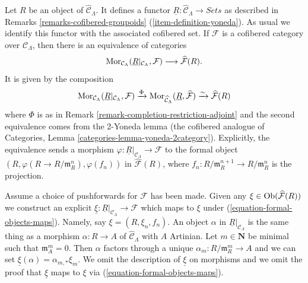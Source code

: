 \begin{remark}
\label{remark-formal-objects-yoneda}
Let $R$ be an object of $\widehat{\mathcal{C}}_\Lambda$.  It defines a functor
$\underline{R}: \widehat{\mathcal{C}}_\Lambda \to \textit{Sets}$
as described in
Remarks \ref{remarks-cofibered-groupoids} (\ref{item-definition-yoneda}).
As usual we identify this functor with the
associated cofibered set.  If $\mathcal{F}$ is a cofibered category over
$\mathcal{C}_\Lambda$, then there is an equivalence of categories
\begin{equation}
\label{equation-formal-objects-maps}
\mathop{\mathrm{Mor}}\nolimits_{\mathcal{C}_\Lambda}(
\underline{R}|_{\mathcal{C}_\Lambda}, \mathcal{F})
\longrightarrow
\widehat{\mathcal{F}}(R).
\end{equation}
It is given by the composition
$$
\mathop{\mathrm{Mor}}\nolimits_{\mathcal{C}_\Lambda}(
\underline{R}|_{\mathcal{C}_\Lambda}, \mathcal{F})
\xrightarrow{\Phi}
\mathop{\mathrm{Mor}}\nolimits_{\widehat{\mathcal{C}}_\Lambda}(
\underline{R}, \widehat{\mathcal{F}})
\xrightarrow{\sim}
\widehat{\mathcal{F}}(R)
$$
where $\Phi$ is as in
Remark \ref{remark-completion-restriction-adjoint}
and the second equivalence comes from the 2-Yoneda lemma
(the cofibered analogue of
Categories, Lemma \ref{categories-lemma-yoneda-2category}).
Explicitly, the equivalence sends a morphism
$\varphi : \underline{R}|_{\mathcal{C}_\Lambda} \to \mathcal{F}$
to the formal object
$(R, \varphi(R \to R/\mathfrak{m}_R^n), \varphi(f_n))$ in
$\widehat{\mathcal{F}}(R)$, where
$f_n : R/\mathfrak m_R^{n + 1} \to R/\mathfrak m_R^n$ is the projection.

\medskip\noindent
Assume a choice of pushforwards for $\mathcal{F}$ has been made.
Given any $\xi \in \mathop{\mathrm{Ob}}\nolimits(\widehat{\mathcal{F}}(R))$ we construct
an explicit
$\underline{\xi} : \underline{R}|_{\mathcal{C}_\Lambda} \to \mathcal{F}$
which maps to $\xi$ under (\ref{equation-formal-objects-maps}).
Namely, say $\xi = (R, \xi_n, f_n)$. An object $\alpha$ in
$\underline{R}|_{\mathcal{C}_\Lambda}$ is the same thing as a morphism
$\alpha : R \to A$ of $\widehat{\mathcal{C}}_\Lambda$ with $A$
Artinian. Let $m \in \mathbf{N}$ be minimal such that $\mathfrak m_A^m = 0$.
Then $\alpha$ factors through a unique $\alpha_m : R/\mathfrak m_R^m \to A$
and we can set $\underline{\xi}(\alpha) = \alpha_{m, *}\xi_m$.
We omit the description of $\underline{\xi}$ on morphisms and we
omit the proof that $\underline{\xi}$ maps to $\xi$
via (\ref{equation-formal-objects-maps}).


\end{remark}
